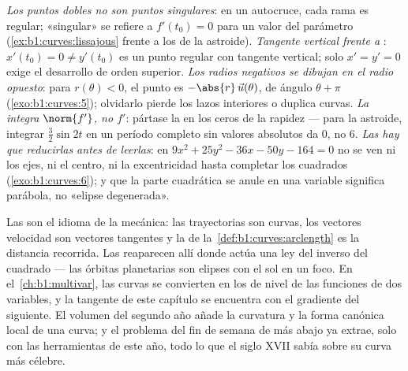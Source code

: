 \begin{remark}
\label{rem:b1:curves:pitfalls}
\emph{Los puntos dobles no son puntos singulares}: en un
autocruce, cada rama es regular; «singular» se refiere a
$f'(t_0) = 0$ para un valor del parámetro
(\cref{ex:b1:curves:lissajous} frente a los  de la
astroide).
\emph{Tangente vertical frente a }:
$x'(t_0) = 0 \neq y'(t_0)$ es un punto regular con tangente
vertical; solo $x' = y' = 0$ exige el desarrollo de orden superior.
\emph{Los radios negativos se dibujan en el radio opuesto}: para
$r(\theta) < 0$, el punto es $-\abs{r}\,\vec u(\theta)$, de ángulo
$\theta + \pi$ (\cref{exo:b1:curves:5}); olvidarlo pierde los lazos
interiores o duplica curvas.
\emph{La  integra $\norm{f'}$, no $f'$}: pártase la
 en los ceros de la rapidez --- para la astroide, integrar
$\frac32\sin 2t$ en un período completo sin valores absolutos da $0$,
no $6$.
\emph{Las  hay que reducirlas antes de leerlas}: en
$9x^2 + 25y^2 - 36x - 50y - 164 = 0$ no se ven ni los ejes, ni el
centro, ni la excentricidad hasta completar los cuadrados
(\cref{exo:b1:curves:6}); y que la parte cuadrática se anule en una
variable significa parábola, no «elipse degenerada».
\end{remark}

\begin{remark}
\label{rem:b1:curves:whereused}
Las  son el idioma de la mecánica: las
trayectorias son curvas, los vectores velocidad son vectores
tangentes y la  de la~\cref{def:b1:curves:arclength}
es la distancia recorrida. Las  reaparecen allí donde actúa
una ley del inverso del cuadrado --- las órbitas planetarias son
elipses con el sol en un foco. En el~\cref{ch:b1:multivar}, las curvas
se convierten en los  de nivel de las funciones de dos
variables, y la tangente de este capítulo se encuentra con el
gradiente del siguiente. El volumen del segundo año añade la
curvatura y la forma canónica local de una curva; y el problema del
fin de semana de más abajo ya extrae, solo con las herramientas de
este año, todo lo que el siglo XVII sabía sobre su curva más célebre.
\end{remark}

